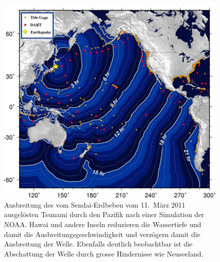 \begin{figure}
\begin{center}
\includegraphics[width=\hsize]{../common/graphics/sendainoaa}
\end{center}
\caption{Ausbreitung des vom Sendai-Erdbeben vom 11.~März 2011 
ausgelösten Tsunami durch den Pazifik nach einer Simulation der NOAA.
Hawai und andere Inseln reduzieren die Wassertiefe und damit die
Ausbreitungsgeschwindigkeit und verzögern damit die Ausbreitung
der Welle. Ebenfalls deutlich beobachtbar ist die Abschattung 
der Welle durch grosse Hindernisse wie Neuseeland.
\label{tsunamiausbreitung}}
\end{figure}

